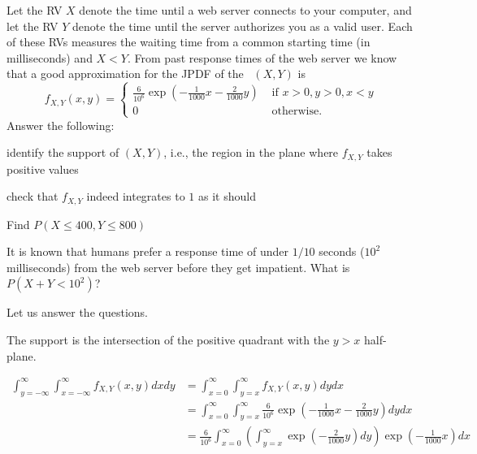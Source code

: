 \begin{example}\label{Eg:PlotPDF2ServerTimes}
Let the RV $X$ denote the time until a web server connects to your computer, and let the RV $Y$ denote the time until the server authorizes you as a valid user.  
Each of these RVs measures the waiting time from a common starting time (in milliseconds) and $X < Y$.  
From past response times of the web server we know that a good approximation for the JPDF of the \rv~$(X,Y)$ is
\[
f_{X,Y}(x,y) = 
\begin{cases}
\frac{6}{10^6} \exp \left( -\frac{1}{1000}x-\frac{2}{1000}y \right)
& \text{ if } x>0,y>0,x <y\\
0 & \text{ otherwise}.
\end{cases}
\]
Answer the following:
\be
\item identify the support of $(X,Y)$, i.e., the region in the plane where $f_{X,Y}$ takes positive values
\item check that $f_{X,Y}$ indeed integrates to $1$ as it should
\item Find $P(X \leq 400, Y \leq 800)$
\item It is known that humans prefer a response time of under $1/10$ seconds ($10^2$ milliseconds) from the web server before they get impatient.  What is $P(X+Y < 10^2)$? 
\ee
\begin{center}
\end{center}
Let us answer the questions.
\be
\item
The support is the intersection of the positive quadrant with the $y>x$ half-plane.
\item
{\scriptsize
\begin{align*}
\int_{y=-\infty}^{\infty}\int_{x=-\infty}^{\infty} f_{X,Y}(x,y) dx dy 
&= \int_{x=0}^{\infty}\int_{y=x}^{\infty} f_{X,Y}(x,y) dy dx\\
&= \int_{x=0}^{\infty}\int_{y=x}^{\infty} \frac{6}{10^6} \exp \left( -\frac{1}{1000}x-\frac{2}{1000}y \right) dy dx\\
&= \frac{6}{10^6} \int_{x=0}^{\infty} \left(\int_{y=x}^{\infty} \exp \left( -\frac{2}{1000}y \right) dy \right) \exp \left(-\frac{1}{1000}x\right) dx\\

\end{align*}}
\end{example}
